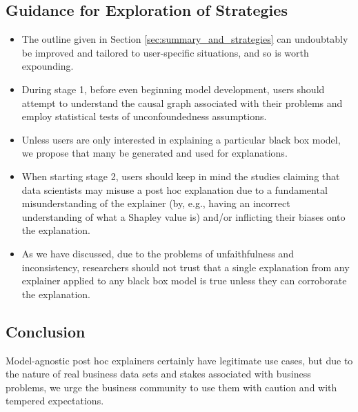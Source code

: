 \documentclass[mnsc,blindrev]{informs3}
\begin{document}
    \subsection{Guidance for Exploration of Strategies}
        \begin{itemize}
        \item The outline given in Section \ref{sec:summary_and_strategies} can undoubtably be improved and tailored to user-specific situations, and so is worth expounding. 
        
        \item During stage 1, before even beginning model development, users should attempt to understand the causal graph associated with their problems and employ statistical tests of unconfoundedness assumptions.

        \item Unless users are only interested in explaining a particular black box model, we propose that many be generated and used for explanations. 

        \item When starting stage 2, users should keep in mind the studies claiming that data scientists may misuse a post hoc explanation due to a fundamental misunderstanding of the explainer (by, e.g., having an incorrect understanding of what a Shapley value is) and/or inflicting their biases onto the explanation. 
        
        \item As we have discussed, due to the problems of unfaithfulness and inconsistency, researchers should not trust that a single explanation from any explainer applied to any black box model is true unless they can corroborate the explanation. 
        \end{itemize}

\subsection{Conclusion}
    Model-agnostic post hoc explainers certainly have legitimate use cases, but due to the nature of real business data sets and stakes associated with business problems, we urge the business community to use them with caution and with tempered expectations.




\newpage
\end{document}
